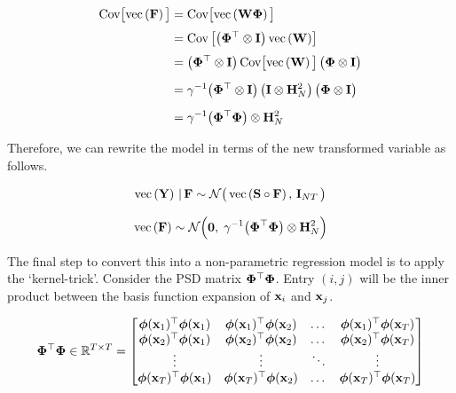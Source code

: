 \begin{align*}
    \text{Cov}\big[\text{\textup{vec}}\left(\mathbf{F}\right)\big] &= \text{Cov}\big[\text{\textup{vec}}\left(\mathbf{W} \mathbf{\Phi}\right)\big] \\[0.1cm]
    &= \text{Cov}\left[\big(\mathbf{\Phi}^\top \otimes \mathbf{I}\big) \, \text{\textup{vec}}\left(\mathbf{W}\right)\right] \\[0.1cm]
    &= \big(\mathbf{\Phi}^\top \otimes \mathbf{I}\big) \, \text{Cov}\big[\text{\textup{vec}}\left(\mathbf{W}\right)\big] \, \big(\mathbf{\Phi} \otimes \mathbf{I}\big) \\[0.2cm]
    &= \gamma^{-1}  \big(\mathbf{\Phi}^\top \otimes \mathbf{I}\big) \, \big(\mathbf{I} \otimes \mathbf{H}_N^{2} \big) \, \big(\mathbf{\Phi} \otimes \mathbf{I}\big) \\[0.2cm]
    &= \gamma^{-1} \big( \mathbf{\Phi}^\top \mathbf{\Phi} \big) \otimes \mathbf{H}_N^2
\end{align*}

Therefore, we can rewrite the model in terms of the new transformed variable as follows. 

\begin{equation}
    \text{\textup{vec}}\left(\mathbf{Y}\right) \, | \, \mathbf{F} \sim \mathcal{N}\big(\, \text{\textup{vec}}\left(\mathbf{S} \circ \mathbf{F}\right), \, \mathbf{I}_{NT} \, \big)
\end{equation}

\begin{equation}
    \label{eq:F_prior2}
    \text{\textup{vec}}\left(\mathbf{F}\right) \sim \mathcal{N}\Big(\mathbf{0}, \; \gamma^{-1} \big(\mathbf{\Phi}^\top \mathbf{\Phi} \big) \otimes \mathbf{H}_N^{2}\Big)
\end{equation}


The final step to convert this into a non-parametric regression model is to apply the `kernel-trick'. Consider the PSD matrix $\mathbf{\Phi}^\top \mathbf{\Phi}$. Entry $(i, j)$ will be the inner product between the basis function expansion of $\mathbf{x}_i$ and $\mathbf{x}_j$. 

\begin{equation}
    \mathbf{\Phi}^\top \mathbf{\Phi} \in \mathbb{R}^{T \times T} = 
    \begin{bmatrix} 
        \boldsymbol{\phi}(\mathbf{x}_1)^\top\boldsymbol{\phi}(\mathbf{x}_1) & \boldsymbol{\phi}(\mathbf{x}_1)^\top\boldsymbol{\phi}(\mathbf{x}_2) & \dots & \boldsymbol{\phi}(\mathbf{x}_1)^\top\boldsymbol{\phi}(\mathbf{x}_T) \\
        \boldsymbol{\phi}(\mathbf{x}_2)^\top\boldsymbol{\phi}(\mathbf{x}_1) & \boldsymbol{\phi}(\mathbf{x}_2)^\top\boldsymbol{\phi}(\mathbf{x}_2) & \dots & \boldsymbol{\phi}(\mathbf{x}_2)^\top\boldsymbol{\phi}(\mathbf{x}_T) \\
        \vdots & \vdots & \ddots & \vdots  \\
        \boldsymbol{\phi}(\mathbf{x}_T)^\top\boldsymbol{\phi}(\mathbf{x}_1) & \boldsymbol{\phi}(\mathbf{x}_T)^\top\boldsymbol{\phi}(\mathbf{x}_2) & \dots & \boldsymbol{\phi}(\mathbf{x}_T)^\top\boldsymbol{\phi}(\mathbf{x}_T) \\
    \end{bmatrix}
\end{equation}

